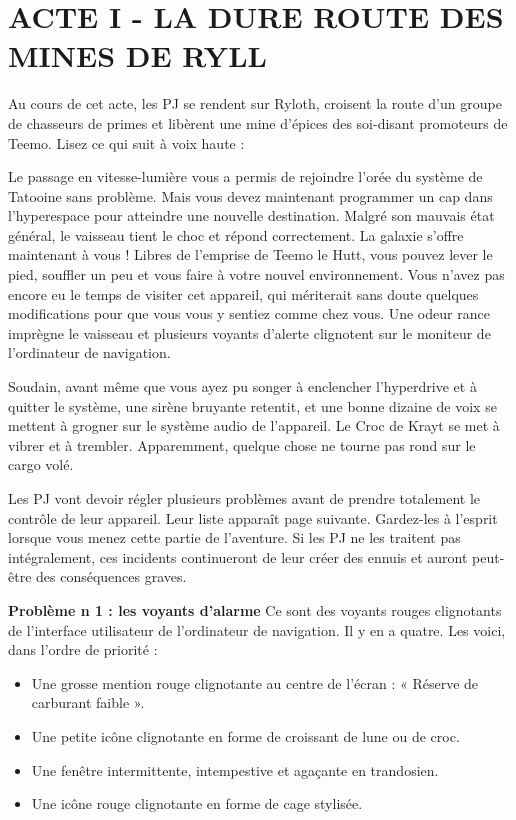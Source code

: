 \documentclass[a4paper,10pt,twoside,twocolumn,openany]{book}
\begin{document}
\chapter{ACTE I - LA DURE ROUTE DES MINES DE RYLL}

Au cours de cet acte, les PJ se rendent sur Ryloth,
croisent la route d’un groupe de chasseurs de primes
et libèrent une mine d’épices des soi-disant promoteurs
de Teemo.
Lisez ce qui suit à voix haute :

\begin{quotebox}
Le passage en vitesse-lumière vous a permis de
rejoindre l’orée du système de Tatooine sans problème. Mais vous devez maintenant programmer
un cap dans l’hyperespace pour atteindre une
nouvelle destination. Malgré son mauvais état
général, le vaisseau tient le choc et répond correctement. La galaxie s’offre maintenant à vous !
Libres de l’emprise de Teemo le Hutt, vous pouvez
lever le pied, souffler un peu et vous faire à votre
nouvel environnement. Vous n’avez pas encore
eu le temps de visiter cet appareil, qui mériterait sans doute quelques modifications pour que
vous vous y sentiez comme chez vous. Une odeur
rance imprègne le vaisseau et plusieurs voyants
d’alerte clignotent sur le moniteur de l’ordinateur
de navigation.

Soudain, avant même que vous ayez pu songer
à enclencher l’hyperdrive et à quitter le système,
une sirène bruyante retentit, et une bonne dizaine
de voix se mettent à grogner sur le système audio
de l’appareil. Le Croc de Krayt se met à vibrer et à
trembler. Apparemment, quelque chose ne tourne
pas rond sur le cargo volé.
\end{quotebox}

Les PJ vont devoir régler plusieurs problèmes avant de
prendre totalement le contrôle de leur appareil. Leur
liste apparaît page suivante. Gardez-les à l’esprit lorsque
vous menez cette partie de l’aventure. Si les PJ ne les
traitent pas intégralement, ces incidents continueront
de leur créer des ennuis et auront peut-être des conséquences graves.

\textbf{Problème n 1 : les voyants d’alarme} Ce sont des
voyants rouges clignotants de l’interface utilisateur de
l’ordinateur de navigation. Il y en a quatre. Les voici, dans
l’ordre de priorité :

\begin{itemize}
\item Une grosse mention rouge clignotante au centre de l’écran : « Réserve de carburant faible ».
\item Une petite icône clignotante en forme de croissant de lune ou de croc.
\item Une fenêtre intermittente, intempestive et agaçante en trandosien.
\item Une icône rouge clignotante en forme de cage stylisée.
\end{itemize}
\end{document}
